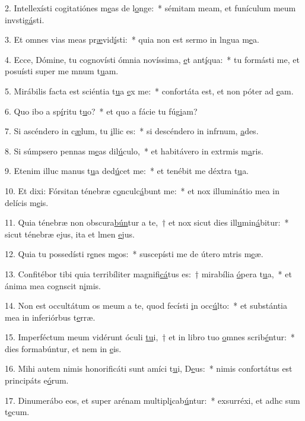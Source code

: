 2. Intellexísti cogitatiónes m\uline{e}as de l\uline{o}nge:~* sémitam meam, et funículum meum invstig\uline{á}sti.\par 
3. Et omnes vias meas pr\uline{æ}vid\uline{í}sti:~* quia non est sermo in lngua m\uline{e}a.\par 
4. Ecce, Dómine, tu cognovísti ómnia novíssima, \uline{e}t ant\uline{í}qua:~* tu formásti me, et posuísti super me mnum t\uline{u}am.\par 
5. Mirábilis facta est sciéntia t\uline{u}a \uline{e}x me:~* confortáta est, et non póter ad \uline{e}am.\par 
6. Quo ibo a sp\uline{í}ritu t\uline{u}o?~* et quo a fácie tu fúg\uline{i}am?\par 
7. Si ascéndero in c\uline{æ}lum, tu \uline{i}llic es:~* si descéndero in infrnum, \uline{a}des.\par 
8. Si súmpsero pennas m\uline{e}as dil\uline{ú}culo,~* et habitávero in extrmis m\uline{a}ris.\par 
9. Etenim illuc manus t\uline{u}a ded\uline{ú}cet me:~* et tenébit me déxtra t\uline{u}a.\par 
10. Et dixi: Fórsitan ténebræ c\uline{o}nculc\uline{á}bunt me:~* et nox illuminátio mea in delícis m\uline{e}is.\par 
11. Quia ténebræ non obscura\uline{bún}tur a te,~† et nox sicut dies ill\uline{u}min\uline{á}bitur:~* sicut ténebræ ejus, ita et lmen \uline{e}jus.\par 
12. Quia tu possedísti r\uline{e}nes m\uline{e}os:~* suscepísti me de útero mtris m\uline{e}æ.\par 
13. Confitébor tibi quia terribíliter magnifi\uline{cá}tus es:~† mirabília \uline{ó}pera t\uline{u}a,~* et ánima mea cognscit n\uline{i}mis.\par 
14. Non est occultátum os meum a te, quod fecísti \uline{i}n occ\uline{ú}lto:~* et substántia mea in inferiórbus t\uline{e}rræ.\par 
15. Imperféctum meum vidérunt óculi \uline{tu}i,~† et in libro tuo \uline{o}mnes scrib\uline{é}ntur:~* dies formabúntur, et nem in \uline{e}is.\par 
16. Mihi autem nimis honorificáti sunt amíci t\uline{u}i, D\uline{e}us:~* nimis confortátus est principáts e\uline{ó}rum.\par 
17. Dinumerábo eos, et super arénam multipl\uline{i}cab\uline{ú}ntur:~* exsurréxi, et adhc sum t\uline{e}cum.\par 
